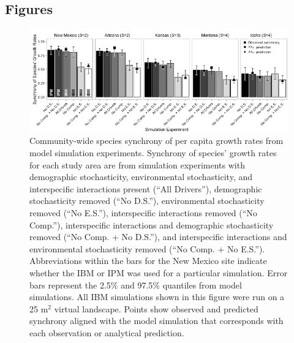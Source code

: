 \documentclass[12pt,]{article}
\begin{document}
\pagebreak{}

\subsection{Figures}\label{figures}

\begin{figure}[!ht]
  \centering
      \includegraphics[width=6in]{./components/formatted_figures/formatted_figure1.png}
  \caption{Community-wide species synchrony of per capita growth rates from model simulation experiments. Synchrony of species' growth rates for each study area are from simulation experiments with demographic stochasticity, environmental stochasticity, and interspecific interactions present (``All Drivers''), demographic stochasticity removed (``No D.S.''), environmental stochasticity removed (``No E.S.''), interspecific interactions removed (``No Comp.''), interspecific interactions and demographic stochasticity removed (``No Comp. + No D.S.''), and interspecific interactions and environmental stochasticity removed (``No Comp. + No E.S.''). Abbreviations within the bars for the New Mexico site indicate whether the IBM or IPM was used for a particular simulation. Error bars represent the 2.5\% and 97.5\% quantiles from model simulations. All IBM simulations shown in this figure were run on a 25 $\text{m}^2$ virtual landscape. Points show observed and predicted synchrony aligned with the model simulation that corresponds with each observation or analytical prediction.}
\end{figure}

\pagebreak{}
\end{document}
